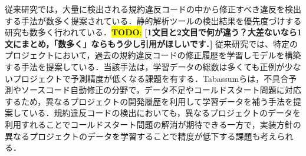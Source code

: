 \documentclass[submit]{ipsj}
\newcommand{\todo}[1]{\colorbox{yellow}{{\bf TODO}:}{\color{red} {\textbf{[#1]}}}}
\begin{document}



従来研究では，大量に検出される規約違反コードの中から修正すべき違反を検出する手法が数多く提案されている\cite{JyuraiPre}．静的解析ツールの検出結果を優先度づけする研究も数多く行われている．\todo{1文目と2文目で何が違う？大差ないなら1文にまとめ，「数多く」ならもう少し引用がほしいです．}
従来研究では、特定のプロジェクトにおいて，過去の規約違反コードの修正履歴を学習しモデルを構築する手法を提案している．当該手法は，学習データの総数は多くても正例が少ないプロジェクトで予測精度が低くなる課題を有する．Tabassumらは，不具合予測やソースコード自動修正の分野で，データ不足やコールドスタート問題に対応するため，異なるプロジェクトの開発履歴を利用して学習データを補う手法を提案している\cite{Tabassum}．規約違反コードの検出においても，異なるプロジェクトのデータを利用すれることでコールドスタート問題の解消が期待できる一方で，実装方針の異なるプロジェクトのデータを学習することで精度が低下する課題も考えられる．
\end{document}
